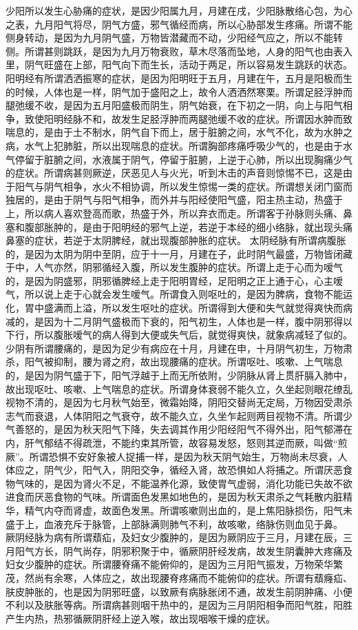 \documentclass[a4paper,12pt,UTF8,twoside]{ctexbook}
\begin{document}
少阳所以发生心胁痛的症状，是因少阳属九月，月建在戌，少阳脉散络心包，为心之表，九月阳气将尽，阴气方盛，邪气循经而病，所以心胁部发生疼痛。所谓不能侧身转动，是因为九月阴气盛，万物皆潜藏而不动，少阳经气应之，所以不能转侧。所谓甚则跳跃，是因为九月万物衰败，草木尽落而坠地，人身的阳气也由表入里，阴气旺盛在上部，阳气向下而生长，活动于两足，所以容易发生跳跃的状态。
阳明经有所谓洒洒振寒的症状，是因为阳明旺于五月，月建在午，五月是阳极而生的时候，人体也是一样，阴气加于盛阳之上，故令人洒洒然寒栗。所谓足胫浮肿而腿弛缓不收，是因为五月阳盛极而阴生，阴气始衰，在下初之一阴，向上与阳气相争，致使阳明经脉不和，故发生足胫浮肿而两腿弛缓不收的症状。所谓因水肿而致喘息的，是由于土不制水，阴气自下而上，居于脏腑之间，水气不化，故为水肿之病，水气上犯肺脏，所以出现喘息的症状。所谓胸部疼痛呼吸少气的，也是由于水气停留于脏腑之间，水液属于阴气，停留于脏腑，上逆于心肺，所以出现胸痛少气的症状。所谓病甚则厥逆，厌恶见人与火光，听到木击的声音则惊惕不已，这是由于阳气与阴气相争，水火不相协调，所以发生惊惕一类的症状。所谓想关闭门窗而独居的，是由于阴气与阳气相争，而外并与阳经使阳气盛，阳主热主动，热盛于上，所以病人喜欢登高而歌，热盛于外，所以弃衣而走。所谓客于孙脉则头痛、鼻塞和腹部胀肿的，是由于阳明经的邪气上逆，若逆于本经的细小络脉，就出现头痛鼻塞的症状，若逆于太阴脾经，就出现腹部肿胀的症状。
太阴经脉有所谓病腹胀的，是因为太阴为阴中至阴，应于十一月，月建在子，此时阴气最盛，万物皆闭藏于中，人气亦然，阴邪循经入腹，所以发生腹肿的症状。所谓上走于心而为嗳气的，是因为阴盛邪，阴邪循脾经上走于阳明胃经，足阳明之正上通于心，心主嗳气，所以说上走于心就会发生嗳气。所谓食入则呕吐的，是因为脾病，食物不能运化，胃中盛满而上溢，所以发生呕吐的症状。所谓得到大便和失气就觉得爽快而病减的，是因为十二月阴气盛极而下衰的，阳气初生，人体也是一样，腹中阴邪得以下行，所以腹胀嗳气的病人得到大便或失气后，就觉得爽快，就象病减轻了似的。
少阴有所谓腰痛的，是因为足少有病应在十月，月建在申，十月阴气初生，万物肃杀，阳气被抑制，腰为肾之府，故出现腰痛的症状。所谓呕吐、咳嗽、上气喘息的，是因为阴气盛于下，阳气浮越于上而无所依附，少阴脉从肾上贯肝膈入肺中，故出现呕吐、咳嗽、上气喘息的症状。所谓身体衰弱不能久立，久坐起则眼花缭乱视物不清的，是因为七月秋气始至，微霜始降，阴阳交替尚无定局，万物因受肃杀志气而衰退，人体阴阳之气衰夺，故不能久立，久坐乍起则两目视物不清。所谓少气善怒的，是因为秋天阳气下降，失去调其作用少阳经阳气不得外出，阳气郁滞在内，肝气郁结不得疏泄，不能约束其所管，故容易发怒，怒则其逆而厥，叫做“煎厥”。所谓恐惧不安好象被人捉捕一样，是因为秋天阴气始生，万物尚未尽衰，人体应之，阴气少，阳气入，阴阳交争，循经入肾，故恐惧如人将捕之。所谓厌恶食物气味的，是因为肾火不足，不能温养化源，致使胃气虚弱，消化功能已失故不欲进食而厌恶食物的气味。所谓面色发黑如地色的，是因为秋天肃杀之气耗散内脏精华，精气内夺而肾虚，故面色发黑。所谓咳嗽则出血的，是上焦阳脉损伤，阳气未盛于上，血液充斥于脉管，上部脉满则肺气不利，故咳嗽，络脉伤则血见于鼻。
厥阴经脉为病有所谓蘈疝，及妇女少腹肿的，是因为厥阴应于三月，月建在辰，三月阳气方长，阴气尚存，阴邪积聚于中，循厥阴肝经发病，故发生阴囊肿大疼痛及妇女少腹肿的症状。所谓腰脊痛不能俯仰的，是因为三月阳气振发，万物荣华繁茂，然尚有余寒，人体应之，故出现腰脊疼痛而不能俯仰的症状。所谓有蘈癃疝、肤皮肿胀的，也是因为阴邪旺盛，以致厥有病脉胀闭不通，故发生前阴肿痛、小便不利以及肤胀等病。所谓病甚则咽干热中的，是因为三月阴阳相争而阳气胜，阳胜产生内热，热邪循厥阴肝经上逆入喉，故出现咽喉干燥的症状。
\end{document}
